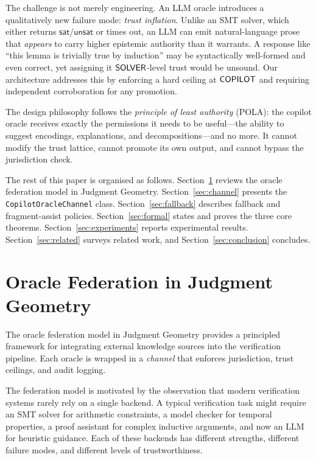 \documentclass[11pt]{article}
\newcommand{\CopChan}{\texttt{CopilotOracleChannel}}
\begin{document}
The challenge is not merely engineering.  An LLM oracle introduces
a qualitatively new failure mode: \emph{trust inflation}.  Unlike
an SMT solver, which either returns $\mathsf{sat}$/$\mathsf{unsat}$
or times out, an LLM can emit natural-language prose that
\emph{appears} to carry higher epistemic authority than it warrants.
A response like ``this lemma is trivially true by induction'' may
be syntactically well-formed and even correct, yet assigning it
$\mathsf{SOLVER}$-level trust would be unsound.  Our architecture
addresses this by enforcing a hard ceiling at $\mathsf{COPILOT}$ and
requiring independent corroboration for any promotion.

The design philosophy follows the \emph{principle of least
authority} (POLA): the copilot oracle receives exactly the
permissions it needs to be useful---the ability to suggest
encodings, explanations, and decompositions---and no more.  It
cannot modify the trust lattice, cannot promote its own output,
and cannot bypass the jurisdiction check.

The rest of this paper is organised as follows.
Section~\ref{sec:federation} reviews the oracle federation model in
Judgment Geometry.  Section~\ref{sec:channel} presents the
\CopChan{} class.  Section~\ref{sec:fallback} describes fallback
and fragment-assist policies.  Section~\ref{sec:formal} states and
proves the three core theorems.  Section~\ref{sec:experiments}
reports experimental results.  Section~\ref{sec:related} surveys
related work, and Section~\ref{sec:conclusion} concludes.


\section{Oracle Federation in Judgment Geometry}
\label{sec:federation}

The oracle federation model in Judgment Geometry provides a
principled framework for integrating external knowledge sources
into the verification pipeline.  Each oracle is wrapped in a
\emph{channel} that enforces jurisdiction, trust ceilings, and
audit logging.

The federation model is motivated by the observation that modern
verification systems rarely rely on a single backend.  A typical
verification task might require an SMT solver for arithmetic
constraints, a model checker for temporal properties, a proof
assistant for complex inductive arguments, and now an LLM for
heuristic guidance.  Each of these backends has different strengths,
different failure modes, and different levels of trustworthiness.
\end{document}
